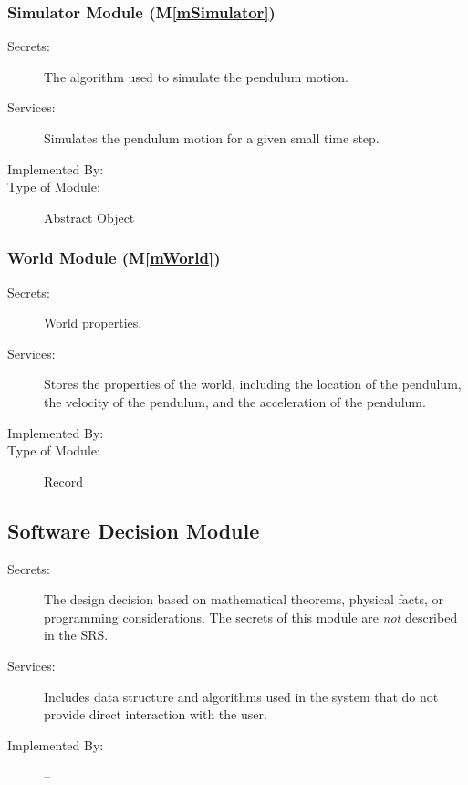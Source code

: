 \documentclass[12pt, titlepage]{article}
\newcommand{\mref}[1]{M\ref{#1}}
\begin{document}
\subsubsection{Simulator Module (\mref{mSimulator})}

\begin{description}
\item[Secrets:] The algorithm used to simulate the pendulum motion.
\item[Services:] Simulates the pendulum motion for a given small time step.
\item[Implemented By:] \progname{}
\item[Type of Module:] Abstract Object
\end{description}

\subsubsection{World Module (\mref{mWorld})}

\begin{description}
\item[Secrets:] World properties.
\item[Services:] Stores the properties of the world, including the location of the pendulum, the
                 velocity of the pendulum, and the acceleration of the pendulum.
\item[Implemented By:] \progname
\item[Type of Module:] Record
\end{description}



\subsection{Software Decision Module}

\begin{description}
\item[Secrets:] The design decision based on mathematical theorems, physical
  facts, or programming considerations. The secrets of this module are
  \emph{not} described in the SRS.
\item[Services:] Includes data structure and algorithms used in the system that
  do not provide direct interaction with the user. 
\item[Implemented By:] --
\end{description}
\end{document}

